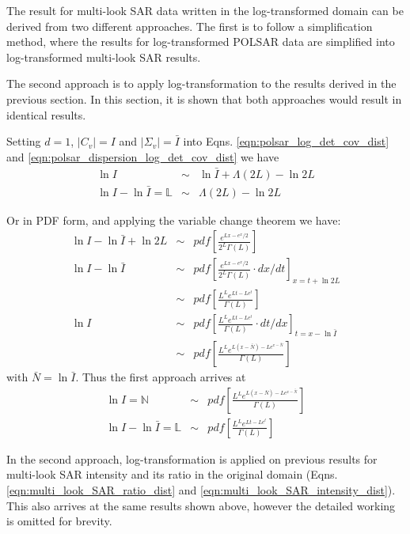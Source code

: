 \documentclass[journal]{IEEEtran}
\begin{document}
The result for multi-look SAR data written in the log-transformed domain can be derived from two different approaches.
The first is to follow a simplification method, where the results for log-transformed POLSAR data are simplified into log-transformed multi-look SAR results.

The second approach is to apply log-transformation to the results derived in the previous section. In this section, it is shown that both approaches would result in identical results.

Setting $d=1$, $|C_v|=I$ and $|\Sigma_v|=\bar{I}$ into Eqns. \ref{eqn:polsar_log_det_cov_dist} and \ref{eqn:polsar_dispersion_log_det_cov_dist}
we have
\begin{eqnarray*}
  \ln{I} &\sim& \ln{\bar{I}} + \Lambda(2L) - \ln{2L}  \\
  \ln{I} - \ln{\bar{I}} = \mathbb{L} &\sim& \Lambda(2L) - \ln{2L} 
\end{eqnarray*}

Or in PDF form, and applying the variable change theorem we have:
\begin{eqnarray*}
  \ln{I} - \ln{\bar{I}} + \ln{2L} &\sim& pdf \left[ \frac{e^{Lx-e^x/2}}{2^L \Gamma(L)} \right] \\
  \ln{I} - \ln{\bar{I}} &\sim& pdf \left[ \frac{e^{Lx-e^x/2}}{2^L \Gamma(L)} \cdot dx/dt \right]_{x=t+\ln{2L}} \\
   &\sim& pdf \left[ \frac{L^Le^{Lt-Le^t}}{ \Gamma(L)}  \right] \\
  \ln{I} &\sim&  pdf \left[ \frac{L^Le^{Lt-Le^t}}{ \Gamma(L)} \cdot dt/dx \right]_{t=x-\ln{\bar{I}}} \\
 &\sim&  pdf \left[ \frac{L^Le^{L(x-\bar{N})-Le^{x-\bar{N}}}}{ \Gamma(L)} \right] 
\end{eqnarray*}
with $\bar{N} = \ln{\bar{I}}$. Thus the first approach arrives at
\begin{eqnarray}
   \ln{I} = \mathbb{N} &\sim&  pdf \left[ \frac{L^Le^{L(x-\bar{N})-Le^{x-\bar{N}}}}{ \Gamma(L)} \right] \\
   \ln{I} - \ln{\bar{I}} = \mathbb{L} &\sim& pdf \left[ \frac{L^Le^{Lt-Le^t}}{ \Gamma(L)}  \right]  
\end{eqnarray}

In the second approach, log-transformation is applied on previous results for multi-look SAR intensity and its ratio in the original domain (Eqns. \ref{eqn:multi_look_SAR_ratio_dist} and \ref{eqn:multi_look_SAR_intensity_dist}).
This also arrives at the same results shown above, however the detailed working is omitted for brevity.
\end{document}
